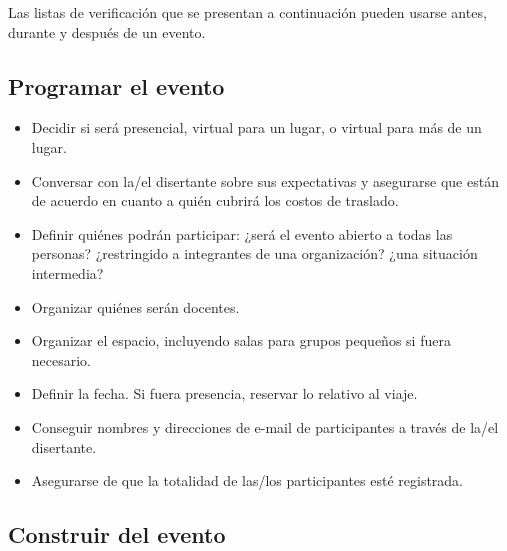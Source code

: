 
Las listas de verificación que se presentan a continuación pueden usarse antes, durante y después de un evento.

\subsection*{Programar el evento}

\begin{itemize}

\item
  Decidir si será presencial,
  virtual para un lugar,
  o virtual para más de un lugar.

\item
  Conversar con la/el disertante sobre sus expectativas
  y asegurarse que están de acuerdo en cuanto a quién cubrirá los costos de traslado.

\item
  Definir quiénes podrán participar:
  ¿será el evento abierto a todas las personas?
  ¿restringido a integrantes de una organización?
  ¿una situación intermedia?

\item
  Organizar quiénes serán docentes.

\item
  Organizar el espacio, incluyendo salas para grupos pequeños si fuera necesario.

\item
  Definir la fecha.
  Si fuera presencia, reservar lo relativo al viaje.

\item
  Conseguir nombres y direcciones de e-mail de participantes a través de la/el disertante.

\item
  Asegurarse de que la totalidad de las/los participantes esté registrada.

\end{itemize}

\subsection*{Construir del evento}

